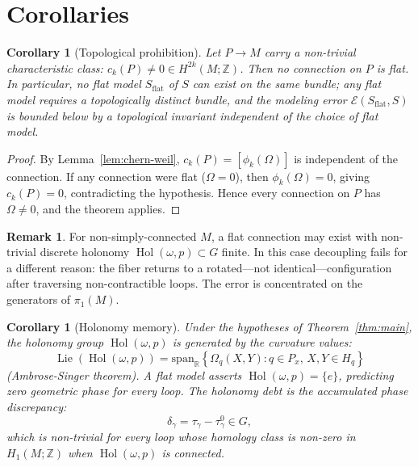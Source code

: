 \documentclass[12pt]{amsart}
\theoremstyle{plain}
\newtheorem{corollary}[theorem]{Corollary}
\theoremstyle{definition}
\newtheorem{remark}[theorem]{Remark}
\DeclareMathOperator{\Hol}{Hol}
\DeclareMathOperator{\Lie}{Lie}
\newcommand{\R}{\mathbb{R}}
\newcommand{\Z}{\mathbb{Z}}
\begin{document}
\section{Corollaries}
\label{sec:corollaries}

\begin{corollary}[Topological prohibition]
\label{cor:topo-prohibit}
Let $P \to M$ carry a non-trivial characteristic class: $c_k(P) \neq 0 \in
H^{2k}(M;\Z)$. Then no connection on $P$ is flat. In particular, no flat
model $S_{\mathrm{flat}}$ of $S$ can exist on the same bundle; any flat
model requires a topologically distinct bundle, and the modeling error
$\mathcal{E}(S_{\mathrm{flat}},S)$ is bounded below by a topological
invariant independent of the choice of flat model.
\end{corollary}

\begin{proof}
By Lemma~\ref{lem:chern-weil}, $c_k(P) = [\phi_k(\Omega)]$ is independent
of the connection. If any connection were flat ($\Omega = 0$), then
$\phi_k(\Omega) = 0$, giving $c_k(P) = 0$, contradicting the hypothesis.
Hence every connection on $P$ has $\Omega \neq 0$, and the theorem applies.
\end{proof}

\begin{remark}
\label{rem:pi1}
For non-simply-connected $M$, a flat connection may exist with non-trivial
discrete holonomy $\Hol(\omega,p) \subset G$ finite. In this case decoupling
fails for a different reason: the fiber returns to a rotated---not
identical---configuration after traversing non-contractible loops. The error
is concentrated on the generators of $\pi_1(M)$.
\end{remark}

\begin{corollary}[Holonomy memory]
\label{cor:holonomy-memory}
Under the hypotheses of Theorem~\ref{thm:main}, the holonomy group
$\Hol(\omega,p)$ is generated by the curvature values:
\[
  \Lie(\Hol(\omega,p)) = \mathrm{span}_\R\left\{
    \Omega_q(X,Y) : q \in P_x,\, X,Y \in H_q
  \right\}
\]
(Ambrose-Singer theorem). A flat model asserts $\Hol(\omega,p) = \{e\}$,
predicting zero geometric phase for every loop. The \emph{holonomy debt}
is the accumulated phase discrepancy:
\[
  \delta_\gamma = \tau_\gamma - \tau^0_\gamma \in G,
\]
which is non-trivial for every loop whose homology class is non-zero in
$H_1(M;\Z)$ when $\Hol(\omega,p)$ is connected.
\end{corollary}
\end{document}
